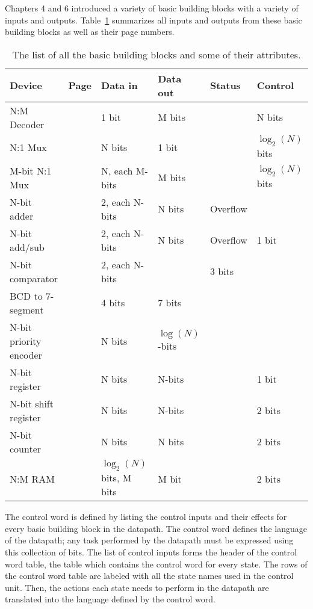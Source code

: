 Chapters 4 and 6 introduced a variety of basic building
blocks with a variety of inputs and outputs.  Table~\ref{table:bbblist}
summarizes all inputs and outputs from these basic building blocks
as well as their page numbers.

\begin{table}
    {\small
        \begin{tabular}{|l|l|l|l|l|l|} \hline
            Device      & Page & Data in     & Data out & Status   & Control \\ \hline
            N:M Decoder & \pageref{page:dec}          & 1 bit       & M bits  &     & N bits  \\ \hline
            N:1 Mux     & \pageref{page:mux}          & N bits  & 1 bit    &     &  $\log_2(N)$ bits  \\ \hline
            M-bit N:1 Mux   & \pageref{page:wmu}          & N, each M-bits  & M bits &     &  $\log_2(N)$
            bits  \\ \hline
            N-bit adder & \pageref{page:add}          & 2, each N-bits & N bits & Overflow &   \\ \hline
            N-bit add/sub & \pageref{page:as}         & 2, each N-bits & N bits & Overflow & 1 bit  \\ \hline
            N-bit comparator & \pageref{page:com}     & 2, each N-bits &  & 3 bits &   \\ \hline
            BCD to 7-segment & \pageref{page:7seg}  & 4 bits & 7 bits & &   \\ \hline
            N-bit priority encoder & \pageref{page:prior}  & N bits & $\log(N)$-bits & &   \\ \hline
            N-bit register & \pageref{page:reg}       & N bits & N-bits &  & 1 bit  \\ \hline
            N-bit shift register & \pageref{page:shi} & N bits & N-bits &  & 2 bits  \\ \hline
            N-bit counter & \pageref{page:counter}        & N bits & N bits &  & 2 bits  \\ \hline
            N:M RAM & \pageref{page:ram}              & $\log_2(N)$ bits, M bits & M bit & & 2 bits  \\ \hline
        \end{tabular}
    }
    \caption{The list of all the basic building blocks and some of their attributes.}
    \label{table:bbblist}
\end{table}
\label{page:boxlist}

The control word is defined by listing the control inputs and their effects
for every basic building block in the datapath.  The control word defines
the language of the datapath; any task performed by the datapath must
be expressed using this collection of bits.  The list of control inputs
forms the header of the control word table, the table which
contains the control word for every state.  The rows of the control word
table are labeled with all the state names used in the control unit.  Then,
the actions each state needs to perform in the datapath are translated
into the language defined by the control word.

